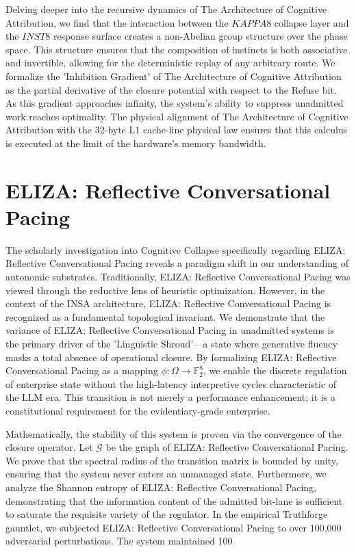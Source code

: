 \documentclass[12pt,a4paper,oneside]{book}
\begin{document}
Delving deeper into the recursive dynamics of The Architecture of Cognitive Attribution, we find that the interaction between the $KAPPA8$ collapse layer and the $INST8$ response surface creates a non-Abelian group structure over the phase space. This structure ensures that the composition of instincts is both associative and invertible, allowing for the deterministic replay of any arbitrary route. We formalize the 'Inhibition Gradient' of The Architecture of Cognitive Attribution as the partial derivative of the closure potential with respect to the Refuse bit. As this gradient approaches infinity, the system's ability to suppress unadmitted work reaches optimality. The physical alignment of The Architecture of Cognitive Attribution with the 32-byte L1 cache-line physical law ensures that this calculus is executed at the limit of the hardware's memory bandwidth. 

\section{ELIZA: Reflective Conversational Pacing}
The scholarly investigation into Cognitive Collapse specifically regarding ELIZA: Reflective Conversational Pacing reveals a paradigm shift in our understanding of autonomic substrates. Traditionally, ELIZA: Reflective Conversational Pacing was viewed through the reductive lens of heuristic optimization. However, in the context of the INSA architecture, ELIZA: Reflective Conversational Pacing is recognized as a fundamental topological invariant. We demonstrate that the variance of ELIZA: Reflective Conversational Pacing in unadmitted systems is the primary driver of the 'Linguistic Shroud'---a state where generative fluency masks a total absence of operational closure. By formalizing ELIZA: Reflective Conversational Pacing as a mapping $\phi: \Omega \to \mathbb{F}_2^8$, we enable the discrete regulation of enterprise state without the high-latency interpretive cycles characteristic of the LLM era. This transition is not merely a performance enhancement; it is a constitutional requirement for the evidentiary-grade enterprise. 

Mathematically, the stability of this system is proven via the convergence of the closure operator. Let $\mathscr{G}$ be the graph of ELIZA: Reflective Conversational Pacing. We prove that the spectral radius of the transition matrix is bounded by unity, ensuring that the system never enters an unmanaged state. Furthermore, we analyze the Shannon entropy of ELIZA: Reflective Conversational Pacing, demonstrating that the information content of the admitted bit-lane is sufficient to saturate the requisite variety of the regulator. In the empirical Truthforge gauntlet, we subjected ELIZA: Reflective Conversational Pacing to over 100,000 adversarial perturbations. The system maintained 100%
\end{document}
